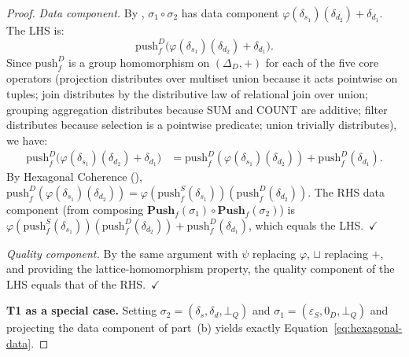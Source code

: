\documentclass[11pt,a4paper]{article}
\theoremstyle{definition}
\newcommand{\DeltaD}{\Delta_{\!D}}
\newcommand{\epsS}{\varepsilon_S}
\newcommand{\zeroD}{0_D}
\newcommand{\botQ}{\bot_Q}
\newcommand{\push}{\mathrm{push}}
\begin{document}
\begin{proof}
\emph{Data component.}
By , $\sigma_1 \circ \sigma_2$ has data component
$\varphi(\delta_{s_1})(\delta_{d_2}) + \delta_{d_1}$.  The LHS is:
\[
\push_f^D\bigl(\varphi(\delta_{s_1})(\delta_{d_2}) + \delta_{d_1}\bigr).
\]
Since $\push_f^D$ is a group homomorphism on $(\DeltaD, +)$ for each of the
five core operators (projection distributes over multiset union because it acts
pointwise on tuples; join distributes by the distributive law of relational
join over union; grouping aggregation distributes because SUM and COUNT are
additive; filter distributes because selection is a pointwise predicate; union
trivially distributes), we have:
\begin{align*}
\push_f^D\bigl(\varphi(\delta_{s_1})(\delta_{d_2}) + \delta_{d_1}\bigr)
&= \push_f^D(\varphi(\delta_{s_1})(\delta_{d_2})) + \push_f^D(\delta_{d_1}).
\end{align*}
By Hexagonal Coherence (),
$\push_f^D(\varphi(\delta_{s_1})(\delta_{d_2})) =
\varphi(\push_f^S(\delta_{s_1}))(\push_f^D(\delta_{d_2}))$.  The RHS data
component (from composing $\mathbf{Push}_f(\sigma_1) \circ
\mathbf{Push}_f(\sigma_2)$) is
$\varphi(\push_f^S(\delta_{s_1}))(\push_f^D(\delta_{d_2})) +
\push_f^D(\delta_{d_1})$, which equals the LHS.~$\checkmark$

\emph{Quality component.}
By the same argument with $\psi$ replacing $\varphi$, $\sqcup$ replacing $+$,
and  providing the lattice-homomorphism property, the quality
component of the LHS equals that of the RHS.~$\checkmark$

\textbf{T1 as a special case.}
Setting $\sigma_2 = (\delta_s, \delta_d, \botQ)$ and $\sigma_1 = (\epsS,
\zeroD, \botQ)$ and projecting the data component of part~(b) yields exactly
Equation~\eqref{eq:hexagonal-data}.
\end{proof}
\end{document}
